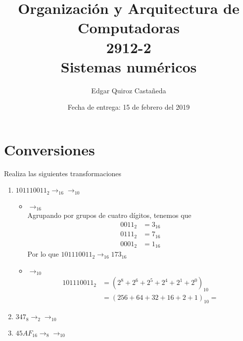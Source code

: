 \documentclass{article}
\begin{document}
    \title{Organización y Arquitectura de Computadoras \\
    \large 2912-2 \\
    \large Sistemas numéricos}

    \date{Fecha de entrega: 15 de febrero del 2019}

    \author{Edgar Quiroz Castañeda}  

    \maketitle
    
    \section{Conversiones}
    Realiza las siguientes transformaciones
    \begin{enumerate}
        \item {
            $101110011_2 \rightarrow_{16} \rightarrow_{10}$
            \begin{itemize}
                \item {
                    $\rightarrow_{16}$ \\
                    Agrupando por grupos de cuatro dígitos, tenemos que 
                    \begin{align*}
                        0011_2 &= 3_{16} \\
                        0111_2 &= 7_{16} \\
                        0001_2 &= 1_{16}
                    \end{align*}
                    Por lo que $101110011_2 \rightarrow_{16} 173_{16}$
                }
                \item {
                    $\rightarrow_{10}$\\
                    \begin{align*}
                        101110011_2 &= (2^8 + 2^6 + 2^5 + 2^4 + 2^1 + 2^0)_{10} \\
                                    &= (256+64+32+16+2+1)_{10} = 
                    \end{align*}

                }
            \end{itemize}
        }
        \item {
            $347_8 \rightarrow_2 \rightarrow_10$
        }
        \item {
            $45AF_16 \rightarrow_8 \rightarrow_10$
        }
    \end{enumerate}
\end{document}
